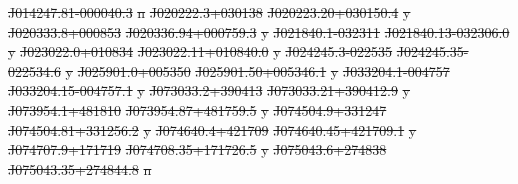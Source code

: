 \documentclass[11pt, a4paper]{book}
\providecommand{\DIFdeltex}[1]{{\protect\color{red}\sout{#1}}}                      %
\providecommand{\DIFdelFL}[1]{\DIFdel{#1}} %
\providecommand{\DIFdel}[1]{\texorpdfstring{\DIFdeltex{#1}}{}} %
\begin{document}
\DIFdelFL{J014247.81-000040.3 }%
\DIFdelFL{n}%
\DIFdelFL{J020222.3+030138 }%
\DIFdelFL{J020223.20+030150.4 }%
\DIFdelFL{y}%
\DIFdelFL{J020333.8+000853 }%
\DIFdelFL{J020336.94+000759.3 }%
\DIFdelFL{y}%
\DIFdelFL{J021840.1-032311 }%
\DIFdelFL{J021840.13-032306.0 }%
\DIFdelFL{y}%
\DIFdelFL{J023022.0+010834 }%
\DIFdelFL{J023022.11+010840.0 }%
\DIFdelFL{y}%
\DIFdelFL{J024245.3-022535 }%
\DIFdelFL{J024245.35-022534.6 }%
\DIFdelFL{y}%
\DIFdelFL{J025901.0+005350 }%
\DIFdelFL{J025901.50+005346.1 }%
\DIFdelFL{y}%
\DIFdelFL{J033204.1-004757 }%
\DIFdelFL{J033204.15-004757.1 }%
\DIFdelFL{y}%
\DIFdelFL{J073033.2+390413 }%
\DIFdelFL{J073033.21+390412.9 }%
\DIFdelFL{y}%
\DIFdelFL{J073954.1+481810 }%
\DIFdelFL{J073954.87+481759.5 }%
\DIFdelFL{y}%
\DIFdelFL{J074504.9+331247 }%
\DIFdelFL{J074504.81+331256.2 }%
\DIFdelFL{y}%
\DIFdelFL{J074640.4+421709 }%
\DIFdelFL{J074640.45+421709.1 }%
\DIFdelFL{y}%
\DIFdelFL{J074707.9+171719 }%
\DIFdelFL{J074708.35+171726.5 }%
\DIFdelFL{y}%
\DIFdelFL{J075043.6+274838 }%
\DIFdelFL{J075043.35+274844.8 }%
\DIFdelFL{n}%
\end{document}

